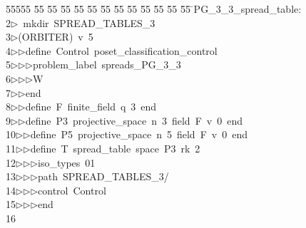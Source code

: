 %
%
\begin{tabbing}
55555 \= 55 \= 55 \= 55 \= 55 \= 55 \= 55 \= 55 \= 55 \= 55 \= 55 \= 55 \= 55 \= \>PG\_3\_3\_spread\_table:\\[0pt]
2\>$\triangleright$\>\ mkdir\ SPREAD\_TABLES\_3\\[0pt]
3\>$\triangleright$\>(ORBITER)\ v\ 5\ \\[0pt]
4\>$\triangleright$\>$\triangleright$\>define\ Control\ poset\_classification\_control\ \\[0pt]
5\>$\triangleright$\>$\triangleright$\>$\triangleright$\>problem\_label\ spreads\_PG\_3\_3\ \\[0pt]
6\>$\triangleright$\>$\triangleright$\>$\triangleright$\>W\ \\[0pt]
7\>$\triangleright$\>$\triangleright$\>end\ \\[0pt]
8\>$\triangleright$\>$\triangleright$\>define\ F\ finite\_field\ q\ 3\ end\ \\[0pt]
9\>$\triangleright$\>$\triangleright$\>define\ P3\ projective\_space\ n\ 3\ field\ F\ v\ 0\ end\ \\[0pt]
10\>$\triangleright$\>$\triangleright$\>define\ P5\ projective\_space\ n\ 5\ field\ F\ v\ 0\ end\ \\[0pt]
11\>$\triangleright$\>$\triangleright$\>define\ T\ spread\_table\ space\ P3\ rk\ 2\ \\[0pt]
12\>$\triangleright$\>$\triangleright$\>$\triangleright$\>iso\_types\ 01\ \\[0pt]
13\>$\triangleright$\>$\triangleright$\>$\triangleright$\>path\ SPREAD\_TABLES\_3/\ \\[0pt]
14\>$\triangleright$\>$\triangleright$\>$\triangleright$\>control\ Control\ \\[0pt]
15\>$\triangleright$\>$\triangleright$\>$\triangleright$\>end\ \\[0pt]
16\>\end{tabbing}
